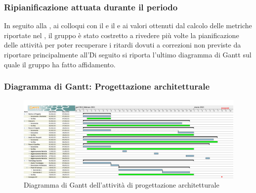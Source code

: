 \subsubsection{Ripianificazione attuata durante il periodo} \label{RipianificazionePArch}
In seguito alla , ai colloqui con il \VT e il \CR e ai valori ottenuti dal calcolo delle metriche riportate nel , il gruppo è stato costretto a rivedere più volte la pianificazione delle attività per poter recuperare i ritardi dovuti a correzioni non previste da riportare principalmente all'\AdR\. 
Di seguito si riporta l'ultimo diagramma di Gantt sul quale il gruppo ha fatto affidamento.
\newpage
\subsubsection{Diagramma di Gantt: Progettazione architetturale}\label{GanttArch}
\begin{figure}[ht]
    \centering
    \includegraphics[width=\textwidth]{Immagini/GanttProgettazioneArchitetturale}
    \caption{Diagramma di Gantt dell'attività di progettazione architetturale}
\end{figure}